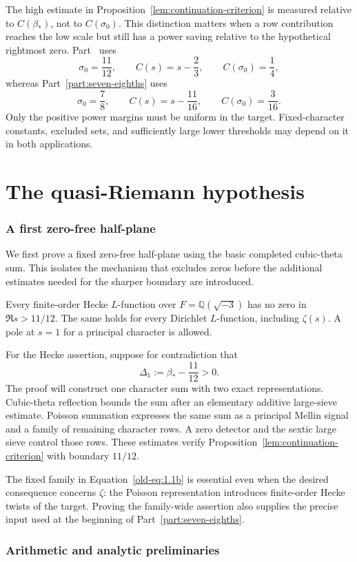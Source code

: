 The high estimate in Proposition~\ref{lem:continuation-criterion} is measured
relative to $C(\beta_*)$, not to $C(\sigma_0)$. This distinction matters when
a row contribution reaches the low scale but still has a power saving relative
to the hypothetical rightmost zero. Part~\ref{part:eleven-twelfths} uses
\[
 \sigma_0=\frac{11}{12},\qquad C(s)=s-\frac23,
 \qquad C(\sigma_0)=\frac14,
\]
whereas Part~\ref{part:seven-eighths} uses
\[
 \sigma_0=\frac78,\qquad C(s)=s-\frac{11}{16},
 \qquad C(\sigma_0)=\frac3{16}.
\]
Only the positive power margins must be uniform in the target. Fixed-character
constants, excluded sets, and sufficiently large lower thresholds may depend
on it in both applications.

\clearpage
\part{The quasi-Riemann hypothesis}
\label{part:eleven-twelfths}

\section{A first zero-free half-plane}
\label{sec:first-stage}

We first prove a fixed zero-free half-plane using the basic completed
cubic-theta sum. This isolates the mechanism that excludes zeros before the
additional estimates needed for the sharper boundary are introduced.

\begin{theorem}
\label{thm:eleven-twelfths}
Every finite-order Hecke $L$-function over $F=\mathbb Q(\sqrt{-3})$ has no
zero in $\Re s>11/12$. The same holds for every Dirichlet $L$-function,
including $\zeta(s)$. A pole at $s=1$ for a principal character is allowed.
\end{theorem}

For the Hecke assertion, suppose for contradiction that
\begin{equation}
 \Delta_1:=\beta_*-\frac{11}{12}>0.
 \label{eq:first-stage-gap}
\end{equation}
The proof will construct one character sum with two exact representations.
Cubic-theta reflection bounds the sum after an elementary additive
large-sieve estimate. Poisson summation expresses the same sum as a principal
Mellin signal and a family of remaining character rows. A zero detector and
the sextic large sieve control those rows. These estimates verify
Proposition~\ref{lem:continuation-criterion} with boundary $11/12$.

The fixed family in Equation~\eqref{old-eq:1.1b} is essential even when the
desired consequence concerns $\zeta$: the Poisson representation introduces
finite-order Hecke twists of the target. Proving the family-wide assertion
also supplies the precise input used at the beginning of
Part~\ref{part:seven-eighths}.

\section{Arithmetic and analytic preliminaries}\label{sec:arithmetic}
